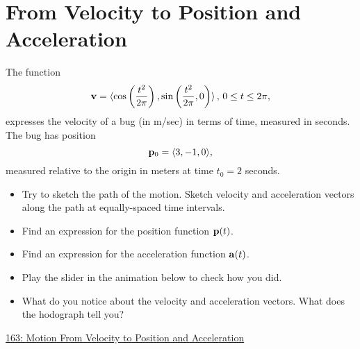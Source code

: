 \documentclass{ximera}
\begin{document}
\section{From Velocity to Position and Acceleration}
\begin{question} \label{Qder44t4tr4tr4}
The function
\[
  {\bf v} = \langle \cos \left( \frac{t^2}{2\pi}  \right) ,  \sin \left( \frac{t^2}{2\pi} , 0 \right)\rangle \, , \, 0\leq t \leq 2\pi ,
\]
expresses the velocity of a bug (in m/sec) in terms of time, measured in seconds. The bug has position
\[
   {\bf p}_0 = \langle 3, -1, 0  \rangle ,
\]
measured relative to the origin in meters at time $t_0 = 2$ seconds.

\begin{itemize}
\item Try to sketch the path of the motion. Sketch velocity and acceleration vectors along the path at equally-spaced time intervals.

\item Find an expression for the position function ${\bf p}(t)$.

\item Find an expression for the acceleration function ${\bf a}(t)$.

\item Play the slider in the animation below to check how you did.

\item What do you notice about the velocity and acceleration vectors. What does the hodograph tell you?

\begin{onlineOnly}
    \begin{center}
\end{center}
\end{onlineOnly}


\end{itemize}
\href{https://www.desmos.com/3d/xhuiyzkueq}{163: Motion From Velocity to Position and Acceleration}

\end{question}
\end{document}
